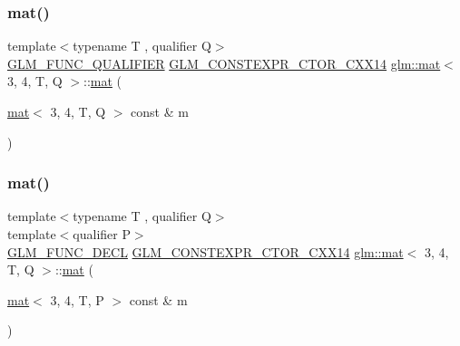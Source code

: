 \subsubsection{\texorpdfstring{mat()}{mat()}\hspace{0.1cm}{\footnotesize\ttfamily [2/21]}}
{\footnotesize\ttfamily template$<$typename T , qualifier Q$>$ \\
\mbox{\hyperlink{setup_8hpp_a33fdea6f91c5f834105f7415e2a64407}{G\+L\+M\+\_\+\+F\+U\+N\+C\+\_\+\+Q\+U\+A\+L\+I\+F\+I\+ER}} \mbox{\hyperlink{setup_8hpp_a0900f9145e68bf6061b6f5e7be3fa751}{G\+L\+M\+\_\+\+C\+O\+N\+S\+T\+E\+X\+P\+R\+\_\+\+C\+T\+O\+R\+\_\+\+C\+X\+X14}} \mbox{\hyperlink{structglm_1_1mat}{glm\+::mat}}$<$ 3, 4, T, Q $>$\+::\mbox{\hyperlink{structglm_1_1mat}{mat}} (\begin{DoxyParamCaption}\item[{\mbox{\hyperlink{structglm_1_1mat}{mat}}$<$ 3, 4, T, Q $>$ const \&}]{m }\end{DoxyParamCaption})}

\mbox{\label{structglm_1_1mat_3_013_00_014_00_01_t_00_01_q_01_4_a04c8fa43e36e082b099a3c7603ad8453}} 
\subsubsection{\texorpdfstring{mat()}{mat()}\hspace{0.1cm}{\footnotesize\ttfamily [3/21]}}
{\footnotesize\ttfamily template$<$typename T , qualifier Q$>$ \\
template$<$qualifier P$>$ \\
\mbox{\hyperlink{setup_8hpp_ab2d052de21a70539923e9bcbf6e83a51}{G\+L\+M\+\_\+\+F\+U\+N\+C\+\_\+\+D\+E\+CL}} \mbox{\hyperlink{setup_8hpp_a0900f9145e68bf6061b6f5e7be3fa751}{G\+L\+M\+\_\+\+C\+O\+N\+S\+T\+E\+X\+P\+R\+\_\+\+C\+T\+O\+R\+\_\+\+C\+X\+X14}} \mbox{\hyperlink{structglm_1_1mat}{glm\+::mat}}$<$ 3, 4, T, Q $>$\+::\mbox{\hyperlink{structglm_1_1mat}{mat}} (\begin{DoxyParamCaption}\item[{\mbox{\hyperlink{structglm_1_1mat}{mat}}$<$ 3, 4, T, P $>$ const \&}]{m }\end{DoxyParamCaption})}

\mbox{\label{structglm_1_1mat_3_013_00_014_00_01_t_00_01_q_01_4_a3802d9e8edd41d580de77f7c318a5265}} 
